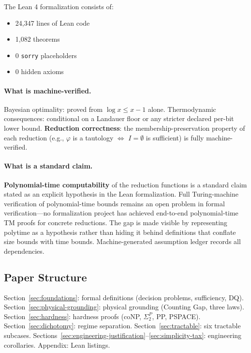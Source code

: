 The Lean 4 formalization consists of:
\begin{itemize}
\item 24,347 lines of Lean code
\item 1,082 theorems
\item 0 \texttt{sorry} placeholders
\item 0 hidden axioms
\end{itemize}

\paragraph{What is machine-verified.}
Bayesian optimality: proved from $\log x \leq x - 1$ alone. Thermodynamic consequences: conditional on a Landauer floor or any stricter declared per-bit lower bound. \textbf{Reduction correctness}: the membership-preservation property of each reduction (e.g., $\varphi$ is a tautology $\Leftrightarrow$ $I = \emptyset$ is sufficient) is fully machine-verified.

\paragraph{What is a standard claim.}
\textbf{Polynomial-time computability} of the reduction functions is a standard claim stated as an explicit hypothesis in the Lean formalization. Full Turing-machine verification of polynomial-time bounds remains an open problem in formal verification---no formalization project has achieved end-to-end polynomial-time TM proofs for concrete reductions. The gap is made visible by representing polytime as a hypothesis rather than hiding it behind definitions that conflate size bounds with time bounds. Machine-generated assumption ledger records all dependencies.

\subsection{Paper Structure}\label{sec:intro-structure}

Section~\ref{sec:foundations}: formal definitions (decision problems, sufficiency, DQ).
Section~\ref{sec:physical-grounding}: physical grounding (Counting Gap, three laws).
Section~\ref{sec:hardness}: hardness proofs (coNP, $\Sigma_2^P$, PP, PSPACE).
Section~\ref{sec:dichotomy}: regime separation.
Section~\ref{sec:tractable}: six tractable subcases.
Sections~\ref{sec:engineering-justification}--\ref{sec:simplicity-tax}: engineering corollaries.
Appendix: Lean listings.

